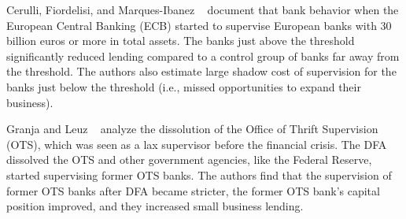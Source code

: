\documentclass[12pt]{article}
\begin{document}
Cerulli, Fiordelisi, and Marques-Ibanez ~\cite{cerulli2021} document that bank behavior when the European Central Banking (ECB) started to supervise European banks with 30 billion euros or more in total assets. The banks just above the threshold significantly reduced lending compared to a control group of banks far away from the threshold. The authors also estimate large shadow cost of supervision for the banks just below the threshold (i.e., missed opportunities to expand their business).

Granja and Leuz ~\cite{granja2018} analyze the dissolution of the Office of Thrift Supervision (OTS), which was seen as a lax supervisor before the financial crisis. The DFA dissolved the OTS and other government agencies, like the Federal Reserve, started supervising former OTS banks. The authors find that the supervision of former OTS banks after DFA became stricter, the former OTS bank's capital position improved, and they increased small business lending.

\pagebreak

{}

\end{document}
